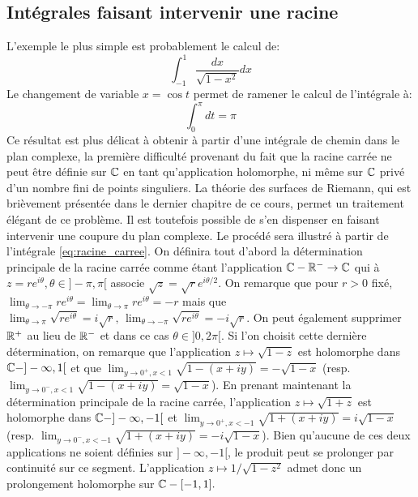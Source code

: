 \subsection{Intégrales faisant intervenir une racine}
L'exemple le plus simple est probablement le calcul de:
\begin{equation}
\label{eq:racine_carree}
\int_{-1}^1 \frac{dx}{\sqrt{1-x^2}} dx
\end{equation}
Le changement de variable $x = \cos t$ permet de ramener le calcul de l'intégrale à:
\[
\int_{0}^\pi dt = \pi
\]
Ce résultat est plus délicat à obtenir à partir d'une intégrale de chemin dans le plan complexe, la première difficulté provenant du fait que la racine carrée ne peut être définie sur $\mathbb{C}$ en tant qu'application holomorphe, ni même sur $\mathbb{C}$ privé d'un nombre fini de points singuliers. La théorie des surfaces de Riemann, qui est brièvement présentée dans le dernier chapitre de ce cours, permet un traitement élégant de ce problème. Il est toutefois possible de s'en dispenser en faisant intervenir une coupure du plan complexe. Le procédé sera illustré à partir de l'intégrale \ref{eq:racine_carree}. On définira tout d'abord la détermination principale de la racine carrée comme étant l'application $\mathbb{C} - \mathbb R^- \to \mathbb{C}$ qui à $z = r e ^{i \theta}, \theta \in ]-\pi,\pi[$ associe $\sqrt{z} = \sqrt{r}e^{i \theta/2}.$ On remarque que pour $r>0$ fixé, $\lim_{\theta \to - \pi} r e^{i\theta} = \lim_{\theta \to \pi} r e^{i\theta}=-r$ mais que $\lim_{\theta \to \pi} \sqrt{re^{i\theta}}=i\sqrt{r}, \, \lim_{\theta \to -\pi} \sqrt{re^{i\theta}}=-i\sqrt{r}.$ On peut également supprimer $\mathbb R^+$ au lieu de $\mathbb R^-$ et dans ce cas $\theta \in ]0, 2 \pi[.$ Si l'on choisit cette dernière détermination, on remarque que l'application $z \mapsto \sqrt{1-z}$ est holomorphe dans $\mathbb{C} - ]-\infty, 1[$ et que $\lim_{y \to 0^+, x < 1}\sqrt{1-(x+iy)} = -\sqrt{1-x}$ (resp. $\lim_{y \to 0^-,x < 1}\sqrt{1-(x+iy)} = \sqrt{1-x}$). En prenant maintenant la détermination principale de la racine carrée, l'application $z \mapsto \sqrt{1+z}$ est holomorphe dans $\mathbb{C} - ]-\infty, -1[$ et $\lim_{y \to 0^+, x < -1}\sqrt{1+(x+iy)} = i\sqrt{1-x}$ (resp. $\lim_{y \to 0^-,x < -1}\sqrt{1+(x+iy)} = -i \sqrt{1-x}$). Bien qu'aucune de ces deux applications ne soient définies sur $]-\infty, -1[$, le produit peut se prolonger par continuité sur ce segment. L'application $z \mapsto 1/\sqrt{1-z^2}$ admet donc un prolongement holomorphe sur $\mathbb{C} -[-1,1].$

